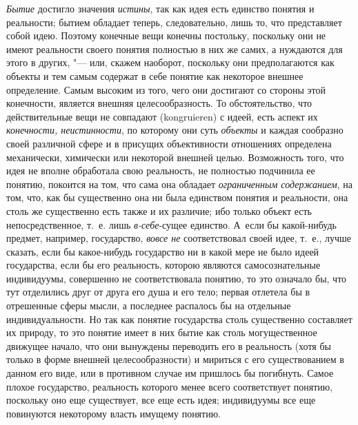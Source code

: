 {\em Бытие} достигло
значения {\em истины},
так как идея есть единство понятия и реальности; бытием
обладает теперь, следовательно, лишь то, что представляет собой идею.
Поэтому конечные вещи конечны постольку, поскольку они не имеют реальности
своего понятия полностью в них же самих, а нуждаются для этого в других, "---
или, скажем наоборот, поскольку они предполагаются как
объекты и тем самым содержат в себе понятие как некоторое внешнее
определение. Самым высоким из того, чего они достигают со стороны этой
конечности, является внешняя целесообразность. То обстоятельство, что
действительные вещи не совпадают (kongruieren) с идеей, есть
аспект их {\em конечности,
неистинности}, по которому они суть
{\em объекты} и каждая
сообразно своей различной сфере и в присущих объективности отношениях
определена механически, химически или некоторой внешней целью. Возможность
того, что идея не вполне обработала свою реальность, не полностью подчинила
ее понятию, покоится на том, что сама она обладает
{\em ограниченным содержанием},
на том, что, как бы существенно она ни была единством понятия
и реальности, она столь же существенно есть также и их различие; ибо
только объект есть непосредственное, т.~е. лишь
{\em в-себе}{}-сущее
единство. А~если бы какой-нибудь предмет, например, государство,
{\em вовсе не}
соответствовал своей идее, т.~е., лучше сказать, если бы
какое-нибудь государство ни в какой мере не было идеей государства, если бы
его реальность, которою являются самосознательные индивидуумы, совершенно
не соответствовала понятию, то это означало бы, что тут отделились друг от
друга его душа и его тело; первая отлетела бы в отрешенные сферы мысли, а
последнее распалось бы на отдельные индивидуальности. Но так как понятие
государства столь существенно составляет их природу, то это понятие имеет в
них бытие как столь могущественное движущее начало, что они вынуждены
переводить его в реальность (хотя бы только в форме внешней
целесообразности) и мириться с его существованием в данном его виде, или в
противном случае им пришлось бы погибнуть. Самое плохое государство,
реальность которого менее всего соответствует понятию, поскольку оно еще
существует, все еще есть идея; индивидуумы все еще повинуются некоторому
власть имущему понятию.

